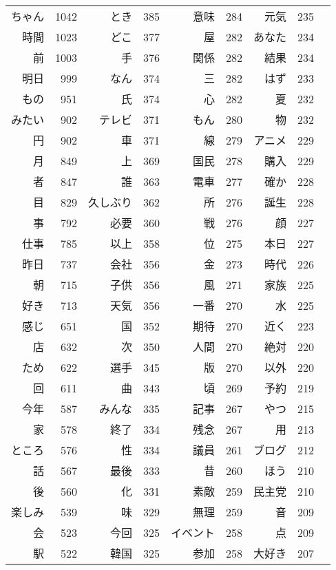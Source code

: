 \begin{longtable}{rrrrrrrrr}
ちゃん & 1042 & とき & 385 & 意味 & 284 & 元気 & 235 \\
時間 & 1023 & どこ & 377 & 屋 & 282 & あなた & 234 \\
前 & 1003 & 手 & 376 & 関係 & 282 & 結果 & 234 \\
明日 & 999 & なん & 374 & 三 & 282 & はず & 233 \\
もの & 951 & 氏 & 374 & 心 & 282 & 夏 & 232 \\
みたい & 902 & テレビ & 371 & もん & 280 & 物 & 232 \\
円 & 902 & 車 & 371 & 線 & 279 & アニメ & 229 \\
月 & 849 & 上 & 369 & 国民 & 278 & 購入 & 229 \\
者 & 847 & 誰 & 363 & 電車 & 277 & 確か & 228 \\
目 & 829 & 久しぶり & 362 & 所 & 276 & 誕生 & 228 \\
事 & 792 & 必要 & 360 & 戦 & 276 & 顔 & 227 \\
仕事 & 785 & 以上 & 358 & 位 & 275 & 本日 & 227 \\
昨日 & 737 & 会社 & 356 & 金 & 273 & 時代 & 226 \\
朝 & 715 & 子供 & 356 & 風 & 271 & 家族 & 225 \\
好き & 713 & 天気 & 356 & 一番 & 270 & 水 & 225 \\
感じ & 651 & 国 & 352 & 期待 & 270 & 近く & 223 \\
店 & 632 & 次 & 350 & 人間 & 270 & 絶対 & 220 \\
ため & 622 & 選手 & 345 & 版 & 270 & 以外 & 220 \\
回 & 611 & 曲 & 343 & 頃 & 269 & 予約 & 219 \\
今年 & 587 & みんな & 335 & 記事 & 267 & やつ & 215 \\
家 & 578 & 終了 & 334 & 残念 & 267 & 用 & 213 \\
ところ & 576 & 性 & 334 & 議員 & 261 & ブログ & 212 \\
話 & 567 & 最後 & 333 & 昔 & 260 & ほう & 210 \\
後 & 560 & 化 & 331 & 素敵 & 259 & 民主党 & 210 \\
楽しみ & 539 & 味 & 329 & 無理 & 259 & 音 & 209 \\
会 & 523 & 今回 & 325 & イベント & 258 & 点 & 209 \\
駅 & 522 & 韓国 & 325 & 参加 & 258 & 大好き & 207 \\
\hline
\end{longtable}





